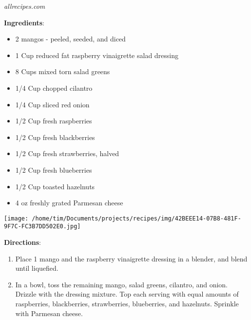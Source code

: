 \documentclass[11pt, twoside, openany]{book}
\begin{document}
 \label{mango-berry-fruit-salad}\hfill\textit{allrecipes.com}\\
\begin{minipage}[t]{0.8\linewidth}
\textbf{Ingredients}:\vspace{-3mm}
\begin{multicols}{2}
\begin{itemize}\setlength\itemsep{-1mm}
\item 2 mangos - peeled, seeded, and diced
\item 1 Cup reduced fat raspberry vinaigrette salad dressing
\item 8 Cups mixed torn salad greens
\item 1/4 Cup chopped cilantro
\item 1/4 Cup sliced red onion
\item 1/2 Cup fresh raspberries
\item 1/2 Cup fresh blackberries
\item 1/2 Cup fresh strawberries, halved
\item 1/2 Cup fresh blueberries
\item 1/2 Cup toasted hazelnuts
\item 4 oz freshly grated Parmesan cheese
\end{itemize}
\end{multicols}
\end{minipage}
\begin{minipage}[t]{0.2\linewidth}
\centering \strut\vspace*{-\baselineskip}\newline
\texttt{[image: /home/tim/Documents/projects/recipes/img/42BEEE14-07B8-481F-9F7C-FC3B7DD502E0.jpg]}\\
\end{minipage}\vspace{3mm}
\textbf{Directions}:
\vspace{-3mm}\begin{enumerate}\setlength\itemsep{-1mm}
\item Place 1 mango and the raspberry vinaigrette dressing in a blender, and blend until liquefied.
\item In a bowl, toss the remaining mango, salad greens, cilantro, and onion. Drizzle with the dressing mixture. Top each serving with equal amounts of raspberries, blackberries, strawberries, blueberries, and hazelnuts. Sprinkle with Parmesan cheese.
\end{enumerate}
\end{document}
